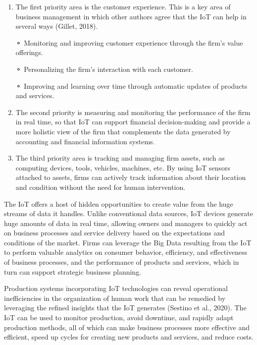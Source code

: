 \documentclass[
  letterpaper,
  DIV=11,
  numbers=noendperiod]{scrreprt}
\begin{document}
\begin{enumerate}
\def\labelenumi{\arabic{enumi}.}
\item
  The first priority area is the customer experience. This is a key area
  of business management in which other authors agree that the IoT can
  help in several ways (Gillet, 2018).

  ⚬ Monitoring and improving customer experience through the firm's
  value offerings.

  ⚬ Personalizing the firm's interaction with each customer.

  ⚬ Improving and learning over time through automatic updates of
  products and services.
\item
  The second priority is measuring and monitoring the performance of the
  firm in real time, so that IoT can support financial decision-making
  and provide a more holistic view of the firm that complements the data
  generated by accounting and financial information systems.
\item
  The third priority area is tracking and managing firm assets, such as
  computing devices, tools, vehicles, machines, etc. By using IoT
  sensors attached to assets, firms can actively track information about
  their location and condition without the need for human intervention.
\end{enumerate}

The IoT offers a host of hidden opportunities to create value from the
huge streams of data it handles. Unlike conventional data sources, IoT
devices generate huge amounts of data in real time, allowing owners and
managers to quickly act on business processes and service delivery based
on the expectations and conditions of the market. Firms can leverage the
Big Data resulting from the IoT to perform valuable analytics on
consumer behavior, efficiency, and effectiveness of business processes,
and the performance of products and services, which in turn can support
strategic business planning.

Production systems incorporating IoT technologies can reveal operational
inefficiencies in the organization of human work that can be remedied by
leveraging the refined insights that the IoT generates (Sestino et al.,
2020). The IoT can be used to monitor production, avoid downtime, and
rapidly adapt production methods, all of which can make business
processes more effective and efficient, speed up cycles for creating new
products and services, and reduce costs.
\end{document}
